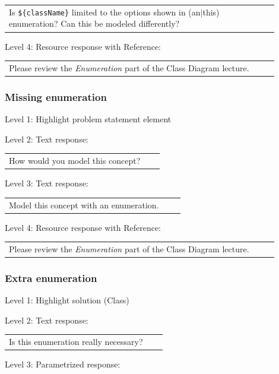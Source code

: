 \begin{tabular}{|p{0.9\linewidth}}
Is \verb|${className}| limited to the options shown in (an$|$this) enumeration? Can this be modeled differently?
\end{tabular} \medskip

\noindent Level 4: Resource response with Reference: \medskip

\begin{tabular}{|p{0.9\linewidth}}
Please review the \textit{Enumeration} part of the Class Diagram lecture.
\end{tabular} \medskip


\subsubsection{Missing enumeration}

\noindent Level 1: Highlight problem statement element \medskip

\noindent Level 2: Text response: \medskip

\begin{tabular}{|p{0.9\linewidth}}
How would you model this concept?
\end{tabular} \medskip

\noindent Level 3: Text response: \medskip

\begin{tabular}{|p{0.9\linewidth}}
Model this concept with an enumeration.
\end{tabular} \medskip

\noindent Level 4: Resource response with Reference: \medskip

\begin{tabular}{|p{0.9\linewidth}}
Please review the \textit{Enumeration} part of the Class Diagram lecture.
\end{tabular} \medskip


\subsubsection{Extra enumeration}

\noindent Level 1: Highlight solution (Class) \medskip

\noindent Level 2: Text response: \medskip

\begin{tabular}{|p{0.9\linewidth}}
Is this enumeration really necessary?
\end{tabular} \medskip

\noindent Level 3: Parametrized response: \medskip

